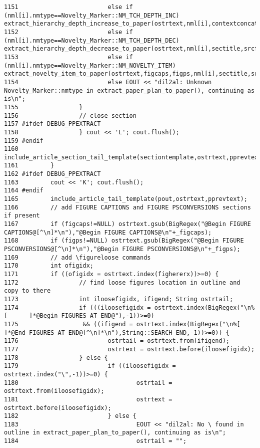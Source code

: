 \begin{verbatim}
1151                         else if (nml[i].nmtype==Novelty_Marker::NM_TCH_DEPTH_INC) extract_hierarchy_depth_increase_to_paper(ostrtext,nml[i],contextconcats,ccranks,sectitle,srcf,srcfname,srcfnum,pprevtext);
1152                         else if (nml[i].nmtype==Novelty_Marker::NM_TCH_DEPTH_DEC) extract_hierarchy_depth_decrease_to_paper(ostrtext,nml[i],sectitle,srcf,srcfname,srcfnum,pprevtext);
1153                         else if (nml[i].nmtype==Novelty_Marker::NM_NOVELTY_ITEM) extract_novelty_item_to_paper(ostrtext,figcaps,figps,nml[i],sectitle,srcf,srcfname,srcfnum,pout,pprevtext);
1154                         else EOUT << "dil2al: Unknown Novelty_Marker::nmtype in extract_paper_plan_to_paper(), continuing as is\n";
1155                 }
1156                 // close section
1157 #ifdef DEBUG_PPEXTRACT
1158                 } cout << 'L'; cout.flush();
1159 #endif
1160                 include_article_section_tail_template(sectiontemplate,ostrtext,pprevtext);
1161         }
1162 #ifdef DEBUG_PPEXTRACT
1163         cout << 'K'; cout.flush();
1164 #endif
1165         include_article_tail_template(pout,ostrtext,pprevtext);
1166         // add FIGURE CAPTIONS and FIGURE PSCONVERSIONS sections if present
1167         if (figcaps!=NULL) ostrtext.gsub(BigRegex("@Begin FIGURE CAPTIONS@[^\n]*\n"),"@Begin FIGURE CAPTIONS@\n"+_figcaps);
1168         if (figps!=NULL) ostrtext.gsub(BigRegex("@Begin FIGURE PSCONVERSIONS@[^\n]*\n"),"@Begin FIGURE PSCONVERSIONS@\n"+_figps);
1169         // add \figureloose commands
1170         int ofigidx;
1171         if ((ofigidx = ostrtext.index(fighererx))>=0) {
1172                 // find loose figures location in outline and copy to there
1173                 int iloosefigidx, ifigend; String ostrtail;
1174                 if (((iloosefigidx = ostrtext.index(BigRegex("\n%[      ]*@Begin FIGURES AT END@"),-1))>=0)
1175                  && ((ifigend = ostrtext.index(BigRegex("\n%[   ]*@End FIGURES AT END@[^\n]*\n"),String::SEARCH_END,-1))>=0)) {
1176                         ostrtail = ostrtext.from(ifigend);
1177                         ostrtext = ostrtext.before(iloosefigidx);
1178                 } else {
1179                         if ((iloosefigidx = ostrtext.index("\",-1))>=0) {
1180                                 ostrtail = ostrtext.from(iloosefigidx);
1181                                 ostrtext = ostrtext.before(iloosefigidx);
1182                         } else {
1183                                 EOUT << "dil2al: No \ found in outline in extract_paper_plan_to_paper(), continuing as is\n";
1184                                 ostrtail = "";

\end{verbatim}

